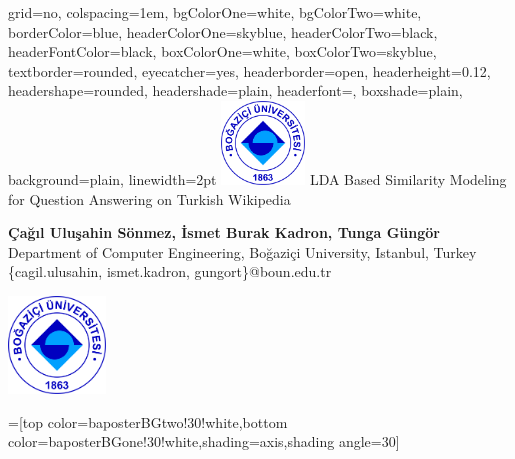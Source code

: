 \documentclass[landscape,final]{baposter}
\begin{document}
\begin{poster}{
  grid=no,
  colspacing=1em,
  bgColorOne=white,
  bgColorTwo=white,
  borderColor=blue,
  headerColorOne=skyblue,
  headerColorTwo=black,
  headerFontColor=black,
  boxColorOne=white,
  boxColorTwo=skyblue,
  textborder=rounded,
  eyecatcher=yes,
  headerborder=open,
  headerheight=0.12\textheight,
  headershape=rounded,
  headershade=plain,
  headerfont=\Large\textsf, %
  boxshade=plain,
  background=plain,
  linewidth=2pt
  }
  {\includegraphics[height=6em]{figures/Bogazici_University_Logo.png}} %
  {\sf \vspace{5pt}%
  \vspace{-14pt}
  LDA Based Similarity Modeling for Question Answering on Turkish Wikipedia
}
  {\sf \Large \vspace{5pt} %
  	\textbf{Çağıl Uluşahin Sönmez, İsmet Burak Kadron, Tunga Güngör}\\
    Department of Computer Engineering, Bo\u{g}azi\c{c}i University, Istanbul, Turkey\\
    \{cagil.ulusahin, ismet.kadron, gungort\}@boun.edu.tr

  }
  {\includegraphics[height=7em]{figures/Bogazici_University_Logo.png}
  }

  =[top color=baposterBGtwo!30!white,bottom color=baposterBGone!30!white,shading=axis,shading angle=30]

     \newlength{\leftimgwidth}
     \setlength{\leftimgwidth}{0.78em+8.0em}


\end{poster}
\end{document}

